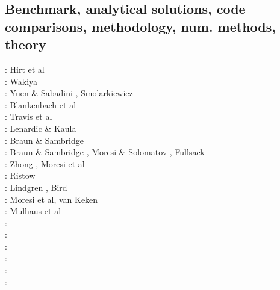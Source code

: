 \subsection{Benchmark, analytical solutions, code comparisons, methodology, num. methods, theory}

\begin{scriptsize}
\nineteenseventyfour: Hirt et al \cite{hiac74}\\
\nineteenseventyfive: Wakiya \cite{waki75a,waki75b}\\
\nineteeneightyfour: Yuen \& Sabadini \cite{yusa84}, Smolarkiewicz \cite{smol84}\\
\nineteeneightynine: Blankenbach et al \cite{blbc89}\\
\nineteenninety: Travis et al \cite{trab90}\\
\nineteenninetythree: Lenardic \& Kaula \cite{leka93}\\
\nineteenninetyfour: Braun \& Sambridge \cite{brsa94}\\
\nineteenninetyfive: Braun \& Sambridge \cite{brsa95}, Moresi \& Solomatov \cite{moso95}, 
                     Fullsack \cite{full95}\\
\nineteenninetysix: Zhong \cite{zhon96}, Moresi et al \cite{mozg96}\\
\nineteenninetyseven: Ristow \cite{rist97}\\
\nineteenninetynine: Lindgren \cite{lind99}, Bird \cite{bird99}\\
\twothousandone: Moresi et al\cite{modm01}, van Keken \cite{vank01}\\
\twothousandtwo: Mulhaus et al \cite{mudm02}\\
\twothousandthree: \cite{taki03}\cite{modm03}\cite{geyu03}\cite{geyu03b}\cite{taxi03}\cite{scpo03}\\
\twothousandfour: \cite{kaps04}\cite{kasa04}\cite{kaks08}\cite{mumc04}\\
\twothousandfive: \cite{mure05}\\
\twothousandsix: \cite{kapo06}\cite{more06}\cite{onmm06}\cite{mudm06}\cite{tact06}\\
\twothousandseven: \cite{toma07}\cite{chcc07}\cite{kabe07}\cite{kaks07}\cite{moql07}\cite{geyu07}\cite{dadh07}
      \cite{zldf07}\\
\twothousandeight: \cite{zhmt08}\cite{deka08}\cite{trub08}\cite{krdp08}\cite{mamo08}\cite{gepd98}
      \cite{vack08}\cite{heta08}\cite{brtf08}\cite{daks08}\cite{chzy08}\cite{tack08}\cite{hust08b}\\

\end{scriptsize}
